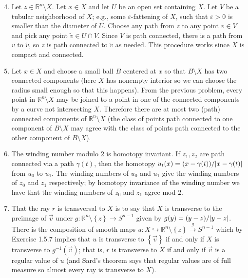 \documentclass[11pt,leqno]{article}
\theoremstyle{plain}
\theoremstyle{definition}
\numberwithin{equation}{section}
\numberwithin{lem}{section}
\newcommand{\cbr}[1]{\left\{#1\right\}}
\begin{document}
\begin{enumerate}
    \setcounter{enumi}{3}
    \item Let $z\in \mathbb R^n\setminus X$. Let $x\in X$ and let $U$ be an open set containing $X$. Let $V$ be a tubular neighborhood of $X$; e.g., some $\varepsilon$-fattening of $X$, such that $\varepsilon>0$ is smaller than the diameter of $U$. Choose any path from $z$ to any point $v\in V$ and pick any point $\tilde v \in U\cap V$. Since $V$ is path connected, there is a path from $v$ to $\tilde v$, so $z$ is path connected to $\tilde v$ as needed. This procedure works since $X$ is compact and connected.
    \item Let $x\in X$ and choose a small ball $B$ centered at $x$ so that $B\setminus X$ has two connected components (here $X$ has nonempty interior so we can choose the radius small enough so that this happens). From the previous problem, every point in $\mathbb R^n\setminus X$ may be joined to a point in one of the connected components by a curve not intersecting $X$. Therefore there are at most two (path) connected components of $\mathbb R^n\setminus X$ (the class of points path connected to one component of $B\setminus X$ may agree with the class of points path connected to the other component of $B\setminus X$).
    \item The winding number modulo $2$ is homotopy invariant. If $z_1,z_2$ are path connected via a path $\gamma(t)$, then the homotopy $u_t(x) = (x-\gamma(t))/\abs{x-\gamma(t)}$ from $u_0 $ to $u_1$. The winding numbers of $u_0$ and $u_1$ give the winding numbers of $z_0$ and $z_1$ respectively; by homotopy invariance of the winding number we have that the winding numbers of $z_0$ and $z_1$ agree mod $2$.
    \item That the ray $r$ is transversal to $X$ is to say that $X$ is transverse to the preimage of $\vec v$ under $g\colon \mathbb R^n\setminus\cbr{z}\to S^{n-1}$ given by $g(y) = (y-z)/\abs{y-z}$. There is the composition of smooth maps $u\colon X\hookrightarrow \mathbb R^n\setminus\cbr{z}\xrightarrow{g}S^{n-1}$ which by Exercise 1.5.7 implies that $u$ is transverse to $\cbr{\vec v}$ if and only if $X$ is transverse to $g^{-1}(\vec v)$; that is, $r$ is transverse to $X$ if and only if $\vec v$ is a regular value of $u$ (and Sard's theorem says that regular values are of full measure so almost every ray is transverse to $X$).
    

\end{enumerate}
\end{document}
